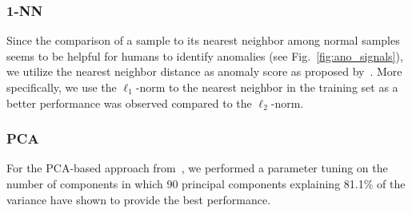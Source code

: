 \documentclass[journal]{IEEEtran}
\begin{document}
\label{sec:baselines}


\subsubsection{1-NN}
Since the comparison of a sample to its nearest neighbor among normal samples seems to be helpful for humans to identify anomalies (see Fig.~\ref{fig:ano_signals}), we utilize the nearest neighbor distance as anomaly score as proposed by~\cite{amer2012nearest}.
More specifically, we use the $\ell_1$-norm to the nearest neighbor in the training set as a better performance was observed compared to the $\ell_2$-norm.
\subsubsection{PCA}
For the PCA-based approach from~\cite{hornung2014model},
we performed a parameter tuning on the number of components in which 90 principal components explaining 81.1\% of the variance have shown to provide the best performance.
\end{document}
